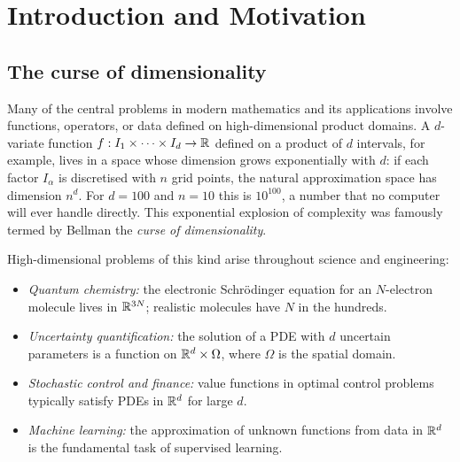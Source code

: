 %
%

\chapter{Introduction and Motivation}
\label{chap:intro}

\section{The curse of dimensionality}
\label{sec:intro:curse}

Many of the central problems in modern mathematics and its applications
involve functions, operators, or data defined on high-dimensional
product domains. A $d$-variate function $f: I_1 \times \cdots \times
I_d \to \mathbb{R}$ defined on a product of $d$ intervals, for example, lives
in a space whose dimension grows exponentially with $d$: if each
factor $I_\alpha$ is discretised with $n$ grid points, the natural
approximation space has dimension $n^d$. For $d = 100$ and $n = 10$
this is $10^{100}$, a number that no computer will ever handle directly.
This exponential explosion of complexity was famously termed by Bellman
the \emph{curse of dimensionality}.

High-dimensional problems of this kind arise throughout science and
engineering:
\begin{itemize}
\item \emph{Quantum chemistry:} the electronic Schrödinger equation
    for an $N$-electron molecule lives in $\mathbb{R}^{3N}$; realistic
    molecules have $N$ in the hundreds.
\item \emph{Uncertainty quantification:} the solution of a PDE with
    $d$ uncertain parameters is a function on $\mathbb{R}^d \times \Omega$,
    where $\Omega$ is the spatial domain.
\item \emph{Stochastic control and finance:} value functions in optimal
    control problems typically satisfy PDEs in $\mathbb{R}^d$ for large $d$.
\item \emph{Machine learning:} the approximation of unknown functions
    from data in $\mathbb{R}^d$ is the fundamental task of supervised learning.
\end{itemize}


